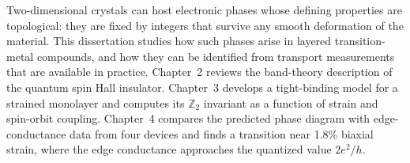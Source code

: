 Two-dimensional crystals can host electronic phases whose defining properties are topological:
they are fixed by integers that survive any smooth deformation of the material. This
dissertation studies how such phases arise in layered transition-metal compounds, and how they
can be identified from transport measurements that are available in practice. Chapter~2
reviews the band-theory description of the quantum spin Hall insulator. Chapter~3 develops a
tight-binding model for a strained monolayer and computes its $\mathbb{Z}_2$ invariant as a
function of strain and spin-orbit coupling. Chapter~4 compares the predicted phase diagram
with edge-conductance data from four devices and finds a transition near 1.8\% biaxial strain,
where the edge conductance approaches the quantized value $2e^2/h$.
